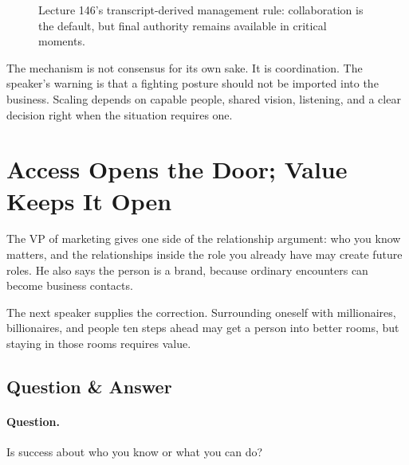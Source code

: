 \documentclass[11pt,oneside]{book}
\begin{document}
\begin{figure}
\centering
{}
\caption{Lecture 146's transcript-derived management rule: collaboration is the default, but final authority remains available in critical moments.}
\end{figure}

The mechanism is not consensus for its own sake. It is coordination. The speaker's warning is that a fighting posture should not be imported into the business. Scaling depends on capable people, shared vision, listening, and a clear decision right when the situation requires one.

\section{Access Opens the Door; Value Keeps It Open}

The VP of marketing gives one side of the relationship argument: who you know matters, and the relationships inside the role you already have may create future roles. He also says the person is a brand, because ordinary encounters can become business contacts.

The next speaker supplies the correction. Surrounding oneself with millionaires, billionaires, and people ten steps ahead may get a person into better rooms, but staying in those rooms requires value.

\subsection{Question \& Answer}

\paragraph{Question.}
Is success about who you know or what you can do?
\end{document}
